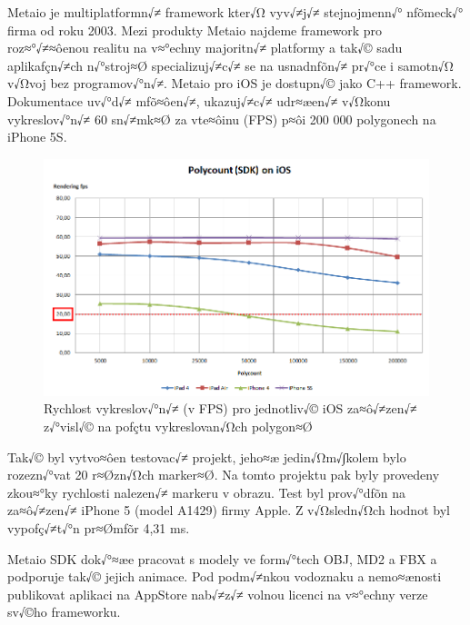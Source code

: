 \documentclass[twoside,12pt]{article}
\begin{document}
Metaio je multiplatformn√≠ framework kter√Ω vyv√≠j√≠ stejnojmenn√° nƒõmeck√° firma od roku 2003. Mezi produkty Metaio najdeme framework pro roz≈°√≠≈ôenou realitu na v≈°echny majoritn√≠ platformy a tak√© sadu aplikaƒçn√≠ch n√°stroj≈Ø specializuj√≠c√≠ se na usnadnƒõn√≠ pr√°ce i samotn√Ω v√Ωvoj bez programov√°n√≠. Metaio pro iOS je dostupn√© jako C++ framework. 
Dokumentace uv√°d√≠ mƒõ≈ôen√≠, ukazuj√≠c√≠ udr≈æen√≠ v√Ωkonu vykreslov√°n√≠ 60 sn√≠mk≈Ø za vte≈ôinu (FPS) p≈ôi 200 000 polygonech na iPhone 5S.

\begin{figure}[H]
\centering
    \includegraphics[width=424px, center]{images/Polycount_SDK_iOS_20fps.png}
\captionsetup{justification=centering}
    \caption{Rychlost vykreslov√°n√≠ (v FPS) pro jednotliv√© iOS za≈ô√≠zen√≠ z√°visl√© na poƒçtu vykreslovan√Ωch polygon≈Ø}
    \label{metaio_benchmark}
\end{figure}

Tak√© byl vytvo≈ôen testovac√≠ projekt, jeho≈æ jedin√Ωm√∫kolem bylo rozezn√°vat 20 r≈Øzn√Ωch marker≈Ø. Na tomto projektu pak byly provedeny zkou≈°ky rychlosti nalezen√≠ markeru v obrazu. Test byl prov√°dƒõn na za≈ô√≠zen√≠ iPhone 5 (model A1429) firmy Apple. Z v√Ωsledn√Ωch hodnot byl vypoƒç√≠t√°n pr≈Ømƒõr 4,31 ms. 


Metaio SDK dok√°≈æe pracovat s modely ve form√°tech OBJ, MD2 a FBX a podporuje tak√© jejich animace. Pod podm√≠nkou vodoznaku a nemo≈ænosti publikovat aplikaci na AppStore nab√≠z√≠ volnou licenci na v≈°echny verze sv√©ho frameworku. 
\end{document}
